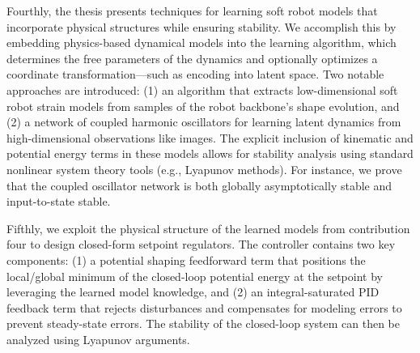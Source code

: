Fourthly, the thesis presents techniques for learning soft robot models that incorporate physical structures while ensuring stability. We accomplish this by embedding physics-based dynamical models into the learning algorithm, which determines the free parameters of the dynamics and optionally optimizes a coordinate transformation—such as encoding into latent space. Two notable approaches are introduced: (1) an algorithm that extracts low-dimensional soft robot strain models from samples of the robot backbone’s shape evolution, and (2) a network of coupled harmonic oscillators for learning latent dynamics from high-dimensional observations like images. The explicit inclusion of kinematic and potential energy terms in these models allows for stability analysis using standard nonlinear system theory tools (e.g., Lyapunov methods). For instance, we prove that the coupled oscillator network is both globally asymptotically stable and input-to-state stable.

Fifthly, we exploit the physical structure of the learned models from contribution four to design closed-form setpoint regulators. The controller contains two key components: (1) a potential shaping feedforward term that positions the local/global minimum of the closed-loop potential energy at the setpoint by leveraging the learned model knowledge, and (2) an integral-saturated PID feedback term that rejects disturbances and compensates for modeling errors to prevent steady-state errors. The stability of the closed-loop system can then be analyzed using Lyapunov arguments.


